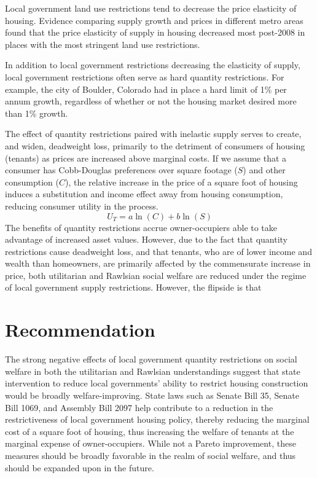 \documentclass[12pt]{extarticle}
\newlength\tindent
\renewcommand{\indent}{\hspace*{\tindent}}
\begin{document}
  \indent Local government land use restrictions tend to decrease the price elasticity of housing. Evidence comparing supply growth and prices in different metro areas found that the price elasticity of supply in housing decreased most post-2008 in places with the most stringent land use restrictions.\supercite{albuquerque_2020}

  \indent In addition to local government restrictions decreasing the elasticity of supply, local government restrictions often serve as hard quantity restrictions. For example, the city of Boulder, Colorado had in place a hard limit of 1\% per annum growth,\supercite{growth_caps} regardless of whether or not the housing market desired more than 1\% growth.

  \indent The effect of quantity restrictions paired with inelastic supply serves to create, and widen, deadweight loss, primarily to the detriment of consumers of housing (tenants) as prices are increased above marginal costs. If we assume that a consumer has Cobb-Douglas preferences over square footage ($S$) and other consumption ($C$), the relative increase in the price of a square foot of housing induces a substitution and income effect away from housing consumption, reducing consumer utility in the process.
  \[U_{T} = a\ln(C) + b\ln(S)\]
  \indent The benefits of quantity restrictions accrue owner-occupiers able to take advantage of increased asset values. However, due to the fact that quantity restrictions cause deadweight loss, and that tenants, who are of lower income and wealth than homeowners\supercite{tenant_income}, are primarily affected by the commensurate increase in price, both utilitarian and Rawlsian social welfare are reduced under the regime of local government supply restrictions. However, the flipside is that 
  \section*{Recommendation}%
  The strong negative effects of local government quantity restrictions on social welfare in both the utilitarian and Rawlsian understandings suggest that state intervention to reduce local governments' ability to restrict housing construction would be broadly welfare-improving. State laws such as Senate Bill 35, Senate Bill 1069, and Assembly Bill 2097 help contribute to a reduction in the restrictiveness of local government housing policy, thereby reducing the marginal cost of a square foot of housing, thus increasing the welfare of tenants at the marginal expense of owner-occupiers. While not a Pareto improvement, these measures should be broadly favorable in the realm of social welfare, and thus should be expanded upon in the future.
  \printbibliography
\end{document}
